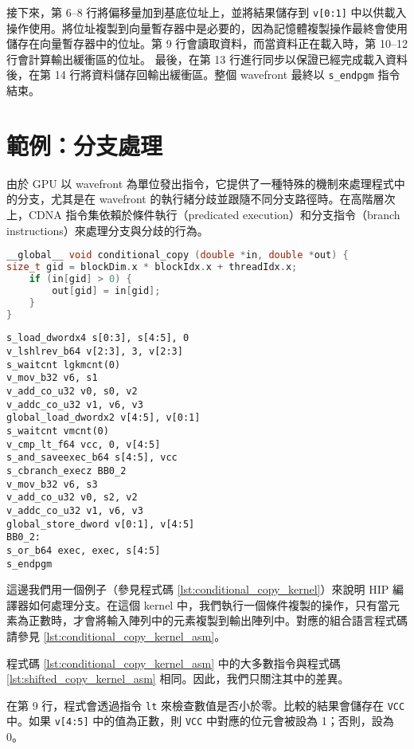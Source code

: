 接下來，第 6–8 行將偏移量加到基底位址上，並將結果儲存到 \lstinline|v[0:1]| 中以供載入操作使用。將位址複製到向量暫存器中是必要的，因為記憶體複製操作最終會使用儲存在向量暫存器中的位址。第 9 行會讀取資料，而當資料正在載入時，第 10–12 行會計算輸出緩衝區的位址。
最後，在第 13 行進行同步以保證已經完成載入資料後，在第 14 行將資料儲存回輸出緩衝區。整個 wavefront 最終以 \lstinline|s_endpgm| 指令結束。

\section{範例：分支處理}
由於 GPU 以 wavefront 為單位發出指令，它提供了一種特殊的機制來處理程式中的分支，尤其是在 wavefront 的執行緒分歧並跟隨不同分支路徑時。在高階層次上，CDNA 指令集依賴於條件執行（predicated execution）和分支指令（branch instructions）來處理分支與分歧的行為。

\begin{lstlisting}[caption={條件記憶體複製 kernel}, label={lst:conditional_copy_kernel}, language={C++}]
__global__ void conditional_copy (double *in, double *out) {
size_t gid = blockDim.x * blockIdx.x + threadIdx.x;
    if (in[gid] > 0) {
        out[gid] = in[gid];
    }
}
\end{lstlisting}

\begin{lstlisting}[caption={從條件記憶體複製 kernel 生成的組合語言程式碼}, label={lst:conditional_copy_kernel_asm}]
s_load_dwordx4 s[0:3], s[4:5], 0
v_lshlrev_b64 v[2:3], 3, v[2:3]
s_waitcnt lgkmcnt(0)
v_mov_b32 v6, s1
v_add_co_u32 v0, s0, v2
v_addc_co_u32 v1, v6, v3
global_load_dwordx2 v[4:5], v[0:1]
s_waitcnt vmcnt(0)
v_cmp_lt_f64 vcc, 0, v[4:5]
s_and_saveexec_b64 s[4:5], vcc
s_cbranch_execz BB0_2
v_mov_b32 v6, s3
v_add_co_u32 v0, s2, v2
v_addc_co_u32 v1, v6, v3
global_store_dword v[0:1], v[4:5]
BB0_2:
s_or_b64 exec, exec, s[4:5]
s_endpgm
\end{lstlisting}

這邊我們用一個例子（參見程式碼 \ref{lst:conditional_copy_kernel}）來說明 HIP 編譯器如何處理分支。在這個 kernel 中，我們執行一個條件複製的操作，只有當元素為正數時，才會將輸入陣列中的元素複製到輸出陣列中。對應的組合語言程式碼請參見 \ref{lst:conditional_copy_kernel_asm}。

程式碼 \ref{lst:conditional_copy_kernel_asm} 中的大多數指令與程式碼 \ref{lst:shifted_copy_kernel_asm} 相同。因此，我們只關注其中的差異。

在第 9 行，程式會透過指令 \lstinline|lt| 來檢查數值是否小於零。比較的結果會儲存在 \lstinline|VCC| 中。如果 \lstinline|v[4:5]| 中的值為正數，則 \lstinline|VCC| 中對應的位元會被設為 1；否則，設為 0。

